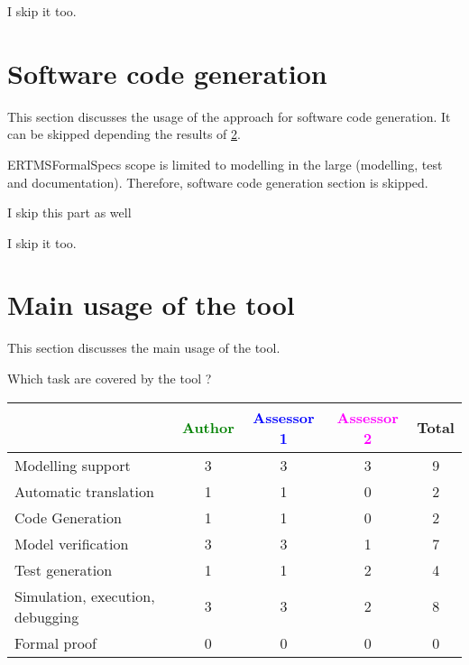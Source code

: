 \begin{assessor2}
I skip it too.
\end{assessor2}


\section{Software code generation}
This section discusses the usage of the approach for software code generation.
It can be skipped depending the results of \ref{main_usage}.

\begin{author_comment}
ERTMSFormalSpecs scope is limited to modelling in the large (modelling, test and documentation). Therefore, software code generation section is skipped.  
\end{author_comment}

\begin{assessor1}
I skip this part as well
\end{assessor1}


\begin{assessor2}
I skip it too.
\end{assessor2}


\section{Main usage of the tool}
\label{main_usage}

This section discusses the main usage of the tool.

Which task are covered by the tool ?

\begin{tabular}{|l | c | c | c | c|}
\hline
& \textcolor{green}{Author} & \textcolor{blue}{Assessor 1} & \textcolor{magenta}{Assessor 2} & Total \\
\hline 
Modelling support & 3 & 3 & 3 & 9 \\
\hline
Automatic translation  & 1 & 1 & 0 & 2 \\
\hline
Code Generation  & 1 & 1 & 0 & 2 \\
\hline
Model verification & 3 & 3 & 1 & 7 \\
\hline
Test generation & 1 & 1 & 2 & 4 \\
\hline
Simulation, execution, debugging & 3 & 3 & 2 & 8 \\
\hline
Formal proof & 0 & 0 & 0 & 0 \\
\hline
\end{tabular}




